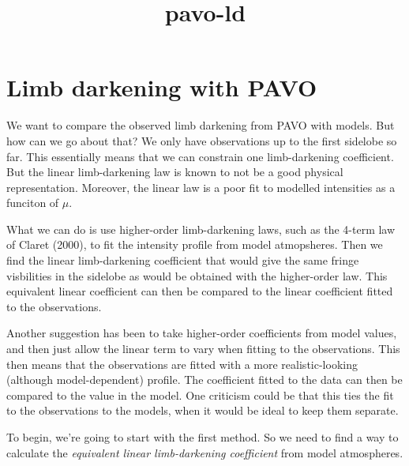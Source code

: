 \documentclass[11pt]{article}
\title{pavo-ld}
\begin{document}
    
    
    \maketitle
    
    

    
    \section{Limb darkening with PAVO}\label{limb-darkening-with-pavo}

We want to compare the observed limb darkening from PAVO with models.
But how can we go about that? We only have observations up to the first
sidelobe so far. This essentially means that we can constrain one
limb-darkening coefficient. But the linear limb-darkening law is known
to not be a good physical representation. Moreover, the linear law is a
poor fit to modelled intensities as a funciton of \(\mu\).

What we can do is use higher-order limb-darkening laws, such as the
4-term law of Claret (2000), to fit the intensity profile from model
atmopsheres. Then we find the linear limb-darkening coefficient that
would give the same fringe visbilities in the sidelobe as would be
obtained with the higher-order law. This equivalent linear coefficient
can then be compared to the linear coefficient fitted to the
observations.

Another suggestion has been to take higher-order coefficients from model
values, and then just allow the linear term to vary when fitting to the
observations. This then means that the observations are fitted with a
more realistic-looking (although model-dependent) profile. The
coefficient fitted to the data can then be compared to the value in the
model. One criticism could be that this ties the fit to the observations
to the models, when it would be ideal to keep them separate.

To begin, we're going to start with the first method. So we need to find
a way to calculate the \emph{equivalent linear limb-darkening
coefficient} from model atmospheres.
\end{document}
